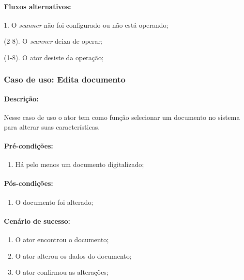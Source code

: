 \paragraph{Fluxos alternativos:}
\begin{description}
    \item 1. O {\it scanner} não foi configurado ou não está operando; 
    \item (2-8). O {\it scanner} deixa de operar; 
    \item (1-8). O ator desiste da operação; 
\end{description}

\newpage
\subsubsection{Caso de uso: Edita documento}

\paragraph{Descrição:} Nesse caso de uso o ator tem como função selecionar um documento no sistema para alterar suas características.

\paragraph{Pré-condições:}
\begin{enumerate}
    \item Há pelo menos um documento digitalizado;
\end{enumerate}

\paragraph{Pós-condições:} 
\begin{enumerate}
    \item O documento foi alterado;
\end{enumerate}
    
\paragraph{Cenário de sucesso:}
\begin{enumerate}
    \item O ator encontrou o documento;
    \item O ator alterou os dados do documento;
    \item O ator confirmou as alterações;
\end{enumerate}

